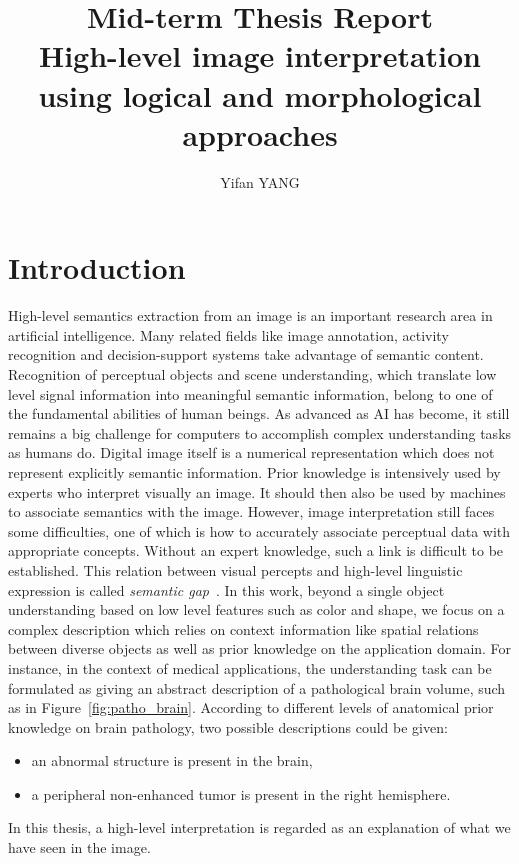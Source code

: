 \documentclass{article}
\title{Mid-term Thesis Report\\High-level image interpretation using logical and morphological approaches}
\author{Yifan YANG}
\date{\parbox{\linewidth}{\centering%
  \today\endgraf\bigskip
  Advisors: Jamal ATIF, Isabelle BLOCH\endgraf\bigskip
  Thesis started in October 2013}}
\begin{document}
\maketitle
\section{Introduction}
 High-level semantics extraction from an image is an important research area  in artificial intelligence.
 Many related fields like image annotation, activity recognition and  decision-support systems take advantage of semantic content.
 Recognition of perceptual objects and scene understanding, which translate low level signal information into meaningful semantic information, belong to one of the fundamental abilities of human beings.
 As advanced as AI has become, it still remains a big challenge for computers to accomplish complex understanding tasks as humans do.
 Digital image itself is a numerical representation which does not represent explicitly semantic information. 
 Prior knowledge is intensively used by experts who interpret visually an image. It should then also be used by machines to associate semantics with the image.  
However, image interpretation still faces some difficulties, one of which is how to accurately associate perceptual data with appropriate concepts. Without an expert knowledge,
such a link is difficult to be established. This relation between visual percepts and high-level linguistic expression is called \textit{semantic gap}~\cite{hudelot2008spatial}.
 In this work, beyond a single object understanding based on low level features such as color and shape, we focus on a complex description which relies on context information like spatial relations
 between diverse objects as well as prior knowledge on the application domain. 
 For instance, in the context of medical applications, the understanding task can be formulated as giving an abstract description of a pathological brain volume, such as in Figure~\ref{fig:patho_brain}. 
  According to different levels of anatomical prior knowledge on brain pathology, two possible descriptions could be given:
 \begin{itemize}
  \item an abnormal structure is present in the brain,
  \item a peripheral non-enhanced tumor is present in the right hemisphere.
 \end{itemize}
 In this thesis, a high-level interpretation is regarded as an explanation of what we have seen in the image.
\end{document}
